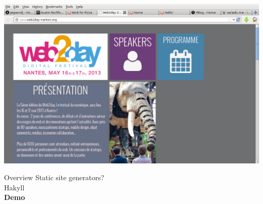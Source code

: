 \documentclass[20pt]{beamer}
\begin{document}
\begin{frame}[plain]
    \includegraphics[width=\textwidth]{../2013-odhac-hakyll/images/example-web2day.png}
\end{frame}


\begin{frame}{Overview}
    Static site generators? \\
    Hakyll \\
    \textbf{Demo} \\
\end{frame}


\begin{frame}[plain]
\end{frame}
\end{document}
